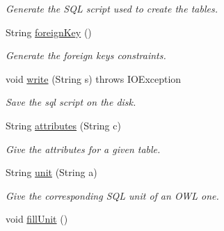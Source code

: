 \begin{DoxyCompactItemize}
\begin{DoxyCompactList}\small\item\em Generate the SQL script used to create the tables. \end{DoxyCompactList}\item 
String \hyperlink{class_data_base_1_1_tables_ac35eb49002e26a8066cee9d139512562}{foreignKey} ()
\begin{DoxyCompactList}\small\item\em Generate the foreign keys constraints. \end{DoxyCompactList}\item 
void \hyperlink{class_data_base_1_1_tables_ac3402b9a61ee3f4d40cb9eb4680213e0}{write} (String s)  throws IOException 
\begin{DoxyCompactList}\small\item\em Save the sql script on the disk. \end{DoxyCompactList}\item 
String \hyperlink{class_data_base_1_1_tables_a0cc659b39257e547f1c5857fe2ba9b0a}{attributes} (String c)
\begin{DoxyCompactList}\small\item\em Give the attributes for a given table. \end{DoxyCompactList}\item 
\hypertarget{class_data_base_1_1_tables_a15e4b8e12eb734a6b9397d6876672e44}{
String \hyperlink{class_data_base_1_1_tables_a15e4b8e12eb734a6b9397d6876672e44}{unit} (String a)}
\label{class_data_base_1_1_tables_a15e4b8e12eb734a6b9397d6876672e44}

\begin{DoxyCompactList}\small\item\em Give the corresponding SQL unit of an OWL one. \end{DoxyCompactList}\item 
\hypertarget{class_data_base_1_1_tables_a19aec04e79a4a0696a86a86ea5853856}{
void \hyperlink{class_data_base_1_1_tables_a19aec04e79a4a0696a86a86ea5853856}{fillUnit} ()}
\label{class_data_base_1_1_tables_a19aec04e79a4a0696a86a86ea5853856}


\end{DoxyCompactItemize}
